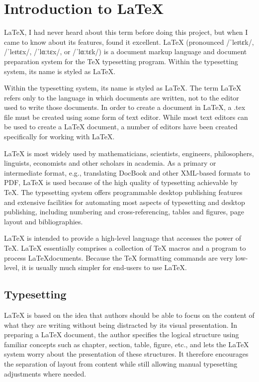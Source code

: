 \section{Introduction to \LaTeX}

\LaTeX, I had never heard about this term before doing this project,
but when I came to know about its features, found it excellent. 
\LaTeX{} (pronounced /ˈleɪtɛk/, /ˈleɪtɛx/, /ˈlɑːtɛx/, or /ˈlɑːtɛk/) is a 
document markup language and document preparation system for the \TeX{} 
typesetting  program. Within the typesetting system, its name is styled 
as \LaTeX.


Within the typesetting system, its name is styled as \LaTeX. The term 
\LaTeX{} refers only to the language in which documents are written, 
not to the editor used to write those documents. In order to create a 
document in \LaTeX, a .tex file must be created using some form of text 
editor. While most text editors can be used to create a \LaTeX{} document, 
a number of editors have been created specifically for working with \LaTeX.

\LaTeX{} is most widely used by mathematicians, scientists, 
engineers, philosophers, linguists, economists and other scholars in 
academia. As a primary or intermediate format, e.g., translating DocBook 
and other XML-based formats to PDF, \LaTeX{} is used because of the 
high quality of typesetting achievable by \TeX. The typesetting system 
offers programmable desktop publishing features and extensive facilities 
for automating most aspects of typesetting and desktop publishing, 
including numbering and cross-referencing, tables and figures, 
page layout and bibliographies.

\LaTeX{} is intended to provide a high-level language that
accesses the power of \TeX. \LaTeX{} essentially comprises a
collection of \TeX{} macros and a program to process \LaTeX documents. 
Because the \TeX{} formatting commands are very low-level, it is usually 
much simpler for end-users to use \LaTeX{}.


\subsection{Typesetting}
\LaTeX{} is based on the idea that authors should be able to focus on 
the content of what they are writing without being distracted by its 
visual presentation. In preparing a \LaTeX{} document, the author 
specifies the logical structure using familiar concepts such as 
chapter, section, table, figure, etc., and lets the \LaTeX{} system 
worry about the presentation of these structures. It therefore 
encourages the separation of layout from content while still allowing 
manual typesetting adjustments where needed. 

